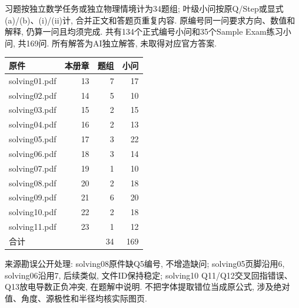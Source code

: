 习题按独立数学任务或独立物理情境计为34题组; 叶级小问按原Q/Step或显式(a)/(b)、(i)/(ii)计, 合并正文和答题页重复内容. 原编号同一问要求方向、数值和解释, 仍算一问且均须完成. 共有134个正式编号小问和35个Sample Exam练习小问, 共169问. 所有解答为AI独立解答, 未取得对应官方答案.
\begin{center}\begin{tabular}{lrrr}\toprule 原件 & 本册章 & 题组 & 小问\\\midrule
solving01.pdf & 13 & 7 & 17\\
solving02.pdf & 14 & 5 & 10\\
solving03.pdf & 15 & 2 & 15\\
solving04.pdf & 16 & 2 & 13\\
solving05.pdf & 17 & 3 & 22\\
solving06.pdf & 18 & 3 & 14\\
solving07.pdf & 19 & 1 & 10\\
solving08.pdf & 20 & 2 & 18\\
solving09.pdf & 21 & 6 & 20\\
solving10.pdf & 22 & 2 & 18\\
solving11.pdf & 23 & 1 & 12\\
\midrule 合计 & & 34 & 169\\\bottomrule\end{tabular}\end{center}
来源勘误公开处理: solving08原件缺Q5编号, 不增造缺问; solving05页脚沿用6, solving06沿用7, 后续类似, 文件ID保持稳定; solving10 Q11/Q12交叉回指错误、Q13放电导数正负冲突, 在题解中说明. 不把字体提取错位当成原公式, 涉及绝对值、角度、源极性和半径均核实际图页.

